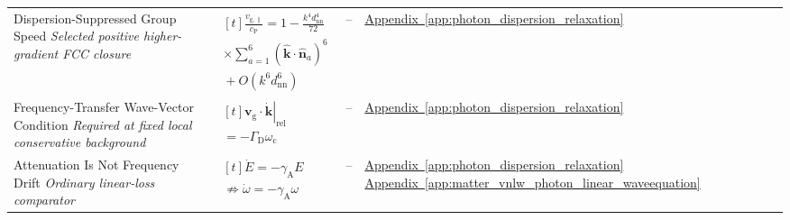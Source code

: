 \begin{longtable}{@{} p{4.5cm} p{6cm} c p{4cm} @{}}
{\raggedright Dispersion-Suppressed Group Speed \newline \textit{Selected positive higher-gradient FCC closure}\par} & {\raggedright $\begin{gathered}[t]\frac{v_{\mathrm{g},\parallel}}{c_{\mathrm P}}=1-\frac{k^4d_{\mathrm{nn}}^4}{72} \\ \times\sum_{a=1}^6(\widehat{\mathbf k}\!\cdot\widehat{\mathbf n}_a)^6 \\ {}+O(k^6d_{\mathrm{nn}}^6)\end{gathered}$\par} & -- & {\raggedright \hyperref[app:photon_dispersion_relaxation]{Appendix~\ref*{app:photon_dispersion_relaxation}}\par} \\

{\raggedright Frequency-Transfer Wave-Vector Condition \newline \textit{Required at fixed local conservative background}\par} & {\raggedright $\begin{gathered}[t]\mathbf v_{\mathrm g}\!\cdot\left.\dot{\mathbf k}\right|_{\mathrm{rel}} \\ =-\Gamma_{\mathrm D}\omega_{\mathrm c}\end{gathered}$\par} & -- & {\raggedright \hyperref[app:photon_dispersion_relaxation]{Appendix~\ref*{app:photon_dispersion_relaxation}}\par} \\

{\raggedright Attenuation Is Not Frequency Drift \newline \textit{Ordinary linear-loss comparator}\par} & {\raggedright $\begin{gathered}[t]\dot E=-\gamma_{\mathrm A}E \\ \not\Rightarrow\dot\omega=-\gamma_{\mathrm A}\omega\end{gathered}$\par} & -- & {\raggedright \hyperref[app:photon_dispersion_relaxation]{Appendix~\ref*{app:photon_dispersion_relaxation}} \newline \hyperref[app:matter_vnlw_photon_linear_waveequation]{Appendix~\ref*{app:matter_vnlw_photon_linear_waveequation}}\par} \\


\end{longtable}

